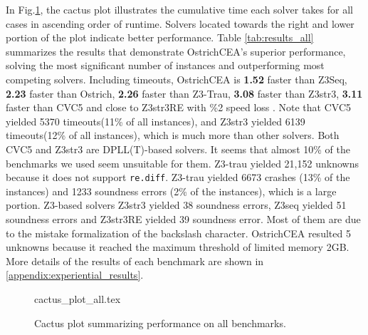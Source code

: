 {%
In Fig.\ref{fig:cactus_all}, the cactus plot illustrates the cumulative time each solver takes for all cases in ascending order of runtime. Solvers located towards the right and lower portion of the plot indicate better performance. \newline
Table \ref{tab:results_all} summarizes the results that demonstrate OstrichCEA's superior performance, solving the most significant number of instances and outperforming most competing solvers. Including timeouts, OstrichCEA is \textbf{1.52}\mult{} faster than Z3Seq, \textbf{2.23}\mult{} faster than Ostrich, \textbf{2.26}\mult{} faster than Z3-Trau, \textbf{3.08}\mult{} faster than Z3str3, \textbf{3.11}\mult{} faster than CVC5 and close to Z3str3RE with \%2 speed loss . Note that CVC5\cite{cvc5} yielded 5370 timeouts(11\% of all instances), and Z3str3\cite{z3str3} yielded 6139 timeouts(12\% of all instances), which is much more than other solvers. Both CVC5 and Z3str3 are DPLL(T)-based solvers. It seems that almost 10\% of the benchmarks we used seem unsuitable for them. Z3-trau\cite{z3trau} yielded 21,152 unknowns because it does not support \verb|re.diff|. Z3-trau\cite{z3trau} yielded 6673 crashes (13\% of the instances) and 1233 soundness errors (2\% of the instances), which is a large portion. Z3-based solvers Z3str3 yielded 38 soundness errors, Z3seq\cite{z3seq} yielded 51 soundness errors and Z3str3RE\cite{z3str3re} yielded 39 soundness error. Most of them are due to the mistake formalization of the backslash character. OstrichCEA resulted 5 unknowns because it reached the maximum threshold of limited memory 2GB. More details of the results of each benchmark are shown in \ref{appendix:experiential_results}.
\begin{figure}[h]
  \centering
  {cactus_plot_all.tex}
  \caption{Cactus plot summarizing performance on all benchmarks.}
  \label{fig:cactus_all}
\end{figure}

}
